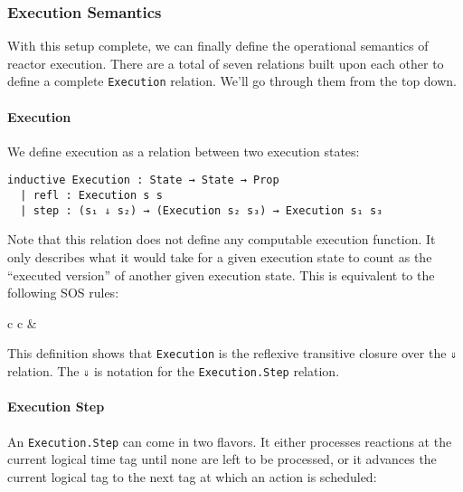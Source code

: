 \subsubsection{Execution Semantics}

With this setup complete, we can finally define the operational semantics of reactor execution.
There are a total of seven relations built upon each other to define a complete \lstinline{Execution} relation.
We'll go through them from the top down.

\paragraph{Execution}

We define execution as a relation between two execution states:

\begin{lstlisting}
inductive Execution : State → State → Prop
  | refl : Execution s s
  | step : (s₁ ⇓ s₂) → (Execution s₂ s₃) → Execution s₁ s₃
\end{lstlisting}

Note that this relation does not define any computable execution function.
It only describes what it would take for a given execution state to count as the ``executed version'' of another given execution state.
This is equivalent to the following SOS rules:

\vspace*{3mm}

\begin{tabular}{c c}
 & 
\end{tabular}

\vspace*{3mm}

This definition shows that \lstinline{Execution} is the reflexive transitive closure over the \lstinline{⇓} relation.
The \lstinline{⇓} is notation for the \lstinline{Execution.Step} relation.

\paragraph{Execution Step}

An \lstinline{Execution.Step} can come in two flavors.
It either processes reactions at the current logical time tag until none are left to be processed, or it advances the current logical tag to the next tag at which an action is scheduled:

